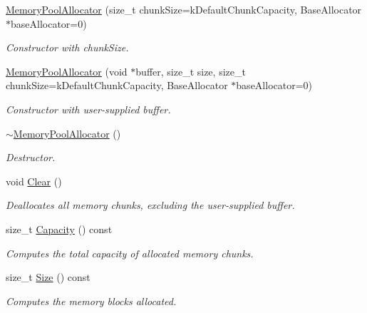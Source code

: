 \begin{DoxyCompactItemize}
\item 
\hyperlink{classMemoryPoolAllocator_aeec85ac657f242ac5620115141be5209}{Memory\+Pool\+Allocator} (size\+\_\+t chunk\+Size=k\+Default\+Chunk\+Capacity, Base\+Allocator $\ast$base\+Allocator=0)
\begin{DoxyCompactList}\small\item\em Constructor with chunk\+Size. \end{DoxyCompactList}\item 
\hyperlink{classMemoryPoolAllocator_a1f0d865093fdb955d956b7a445a8ddbf}{Memory\+Pool\+Allocator} (void $\ast$buffer, size\+\_\+t size, size\+\_\+t chunk\+Size=k\+Default\+Chunk\+Capacity, Base\+Allocator $\ast$base\+Allocator=0)
\begin{DoxyCompactList}\small\item\em Constructor with user-\/supplied buffer. \end{DoxyCompactList}\item 
\hyperlink{classMemoryPoolAllocator_ad4eee0ef3cfe8cda31034fbce98b7a9b}{$\sim$\+Memory\+Pool\+Allocator} ()
\begin{DoxyCompactList}\small\item\em Destructor. \end{DoxyCompactList}\item 
\mbox{\label{classMemoryPoolAllocator_a57bbc80e570db6110901b9a7e36dbda0}} 
void \hyperlink{classMemoryPoolAllocator_a57bbc80e570db6110901b9a7e36dbda0}{Clear} ()
\begin{DoxyCompactList}\small\item\em Deallocates all memory chunks, excluding the user-\/supplied buffer. \end{DoxyCompactList}\item 
size\+\_\+t \hyperlink{classMemoryPoolAllocator_a5672e0833fda2e71ce987911397489ed}{Capacity} () const
\begin{DoxyCompactList}\small\item\em Computes the total capacity of allocated memory chunks. \end{DoxyCompactList}\item 
size\+\_\+t \hyperlink{classMemoryPoolAllocator_ae7fcf0341c13e899cf488bc7c8949956}{Size} () const
\begin{DoxyCompactList}\small\item\em Computes the memory blocks allocated. \end{DoxyCompactList}\item 

\end{DoxyCompactItemize}
